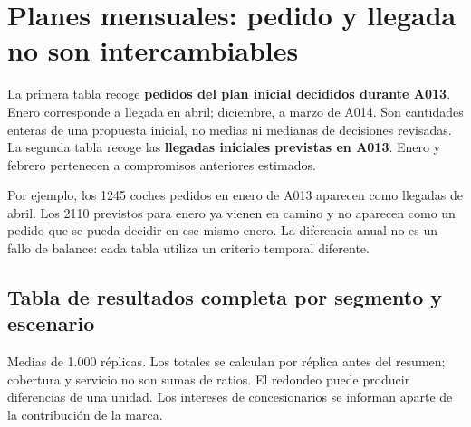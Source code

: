 \appendix
\section{Planes mensuales: pedido y llegada no son intercambiables}\label{anexo:planes}

La primera tabla recoge \textbf{pedidos del plan inicial decididos durante A013}.
Enero corresponde a llegada en abril; diciembre, a marzo de A014. Son cantidades
enteras de una propuesta inicial, no medias ni medianas de decisiones revisadas.
La segunda tabla recoge las \textbf{llegadas iniciales previstas en A013}.
Enero y febrero pertenecen a compromisos anteriores estimados.

\begin{table}[htbp]\centering
\caption{Pedidos iniciales por mes de decisión A013, coches.}\label{tab:pedidos}
{\small\setlength{\tabcolsep}{3pt}}
\end{table}

\begin{table}[htbp]\centering
\caption{Llegadas del plan inicial por mes de recepción A013, coches.}\label{tab:llegadas}
{\small\setlength{\tabcolsep}{3pt}}
\end{table}

Por ejemplo, los \num{1245} coches pedidos en enero de A013 aparecen como
llegadas de abril. Los \num{2110} previstos para enero ya vienen en camino
y no aparecen como un pedido que se pueda decidir en ese mismo enero.
La diferencia anual no es un fallo de balance: cada tabla utiliza un criterio
temporal diferente.
\FloatBarrier

\clearpage
\begin{landscape}
\pagestyle{plain}
\section{Tabla de resultados completa por segmento y escenario}\label{anexo:tabla5}
\noindent\small Medias de 1.000 réplicas. Los totales se calculan por réplica
antes del resumen; cobertura y servicio no son sumas de ratios. El redondeo puede
producir diferencias de una unidad. Los intereses de concesionarios se informan
aparte de la contribución de la marca.
{\footnotesize\renewcommand{\arraystretch}{1.02}\setlength{\tabcolsep}{5pt}}
\end{landscape}
\pagestyle{fancy}
\clearpage

